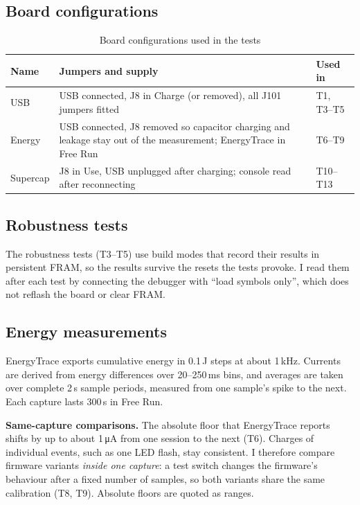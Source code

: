 \documentclass[11pt,a4paper]{article}
\newcommand{\uA}{\,\si{\micro\ampere}}
\begin{document}
\subsection{Board configurations}

\begin{table}[H]
\centering\small
\caption{Board configurations used in the tests}
\label{tab:configs}
\begin{tabularx}{\textwidth}{@{}lLl@{}}
\toprule
Name & Jumpers and supply & Used in \\
\midrule
USB & USB connected, J8 in Charge (or removed), all J101 jumpers fitted & T1, T3--T5 \\
Energy & USB connected, J8 removed so capacitor charging and leakage stay out of the measurement; EnergyTrace in Free Run & T6--T9 \\
Supercap & J8 in Use, USB unplugged after charging; console read after reconnecting & T10--T13 \\
\bottomrule
\end{tabularx}
\end{table}

\subsection{Robustness tests}

The robustness tests (T3--T5) use build modes that record their results in persistent FRAM, so the results survive the resets the tests provoke. I read them after each test by connecting the debugger with ``load symbols only'', which does not reflash the board or clear FRAM.

\subsection{Energy measurements}
\label{sec:method}

EnergyTrace exports cumulative energy in 0.1\,\textmu J steps at about 1\,kHz. Currents are derived from energy differences over 20--250\,ms bins, and averages are taken over complete 2\,s sample periods, measured from one sample's spike to the next. Each capture lasts 300\,s in Free Run.

\textbf{Same-capture comparisons.} The absolute floor that EnergyTrace reports shifts by up to about 1\uA{} from one session to the next (T6). Charges of individual events, such as one LED flash, stay consistent. I therefore compare firmware variants \emph{inside one capture}: a test switch changes the firmware's behaviour after a fixed number of samples, so both variants share the same calibration (T8, T9). Absolute floors are quoted as ranges.
\end{document}
